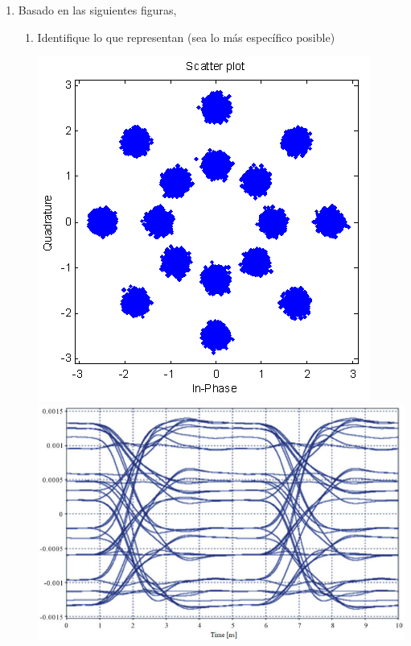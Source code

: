 \begin{enumerate}
\begin{enumerate}
\item Basado en las siguientes figuras,
\begin{enumerate}
	\item Identifique lo que representan (sea lo más específico posible) 
	\begin{center}
		\includegraphics[scale=0.37]{Imagenes/fig2a.png}  \quad
		\includegraphics[scale=1]{Imagenes/fig2b.png}  \quad

\end{center}
\end{enumerate}
\end{enumerate}
\end{enumerate}
